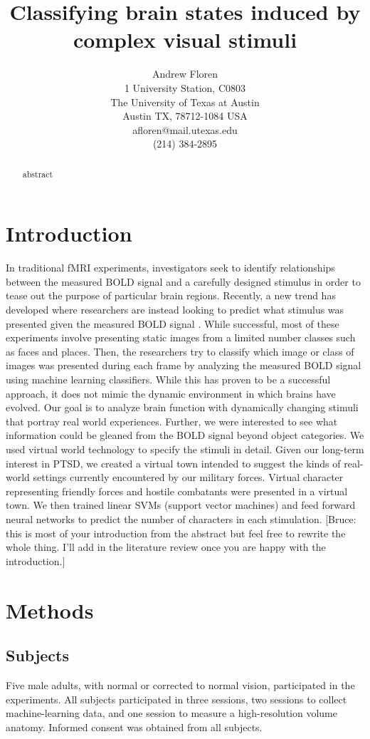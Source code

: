 \documentclass[final]{article}
\title{Classifying brain states induced by complex visual stimuli}
\author{Andrew Floren\\
1 University Station, C0803\\
The University of Texas at Austin\\
Austin TX, 78712-1084 USA\\
afloren@mail.utexas.edu\\
(214) 384-2895\\}
\date{}
\begin{document}
\maketitle

\begin{abstract}
abstract
\end{abstract}

\section{Introduction}
In traditional fMRI experiments, investigators seek to identify relationships between the measured BOLD signal and a carefully designed stimulus in order to tease out the purpose of particular brain regions.
Recently, a new trend has developed where researchers are instead looking to predict what stimulus was presented given the measured BOLD signal \cite{Haxby2001,Mitchell2003,Haynes2006}.
While successful, most of these experiments involve presenting static images from a limited number classes such as faces and places.
Then, the researchers try to classify which image or class of images was presented during each frame by analyzing the measured BOLD signal using machine learning classifiers.
While this has proven to be a successful approach, it does not mimic the dynamic environment in which brains have evolved.
Our goal is to analyze brain function with dynamically changing stimuli that portray real world experiences.
Further, we were interested to see what information could be gleaned from the BOLD signal beyond object categories.
We used virtual world technology to specify the stimuli in detail.
Given our long-term interest in PTSD, we created a virtual town intended to suggest the kinds of real-world settings currently encountered by our military forces.
Virtual character representing friendly forces and hostile combatants were presented in a virtual town.
We then trained linear SVMs (support vector machines) and feed forward neural networks to predict the number of characters in each stimulation.
[Bruce: this is most of your introduction from the abstract but feel free to rewrite the whole thing. I'll add in the literature review once you are happy with the introduction.]

\section{Methods}

\subsection{Subjects}
Five male adults, with normal or corrected to normal vision, participated in the experiments. 
All subjects participated in three sessions, two sessions to collect machine-learning data, and one session to measure a high-resolution volume anatomy. 
Informed consent was obtained from all subjects.
\end{document}
